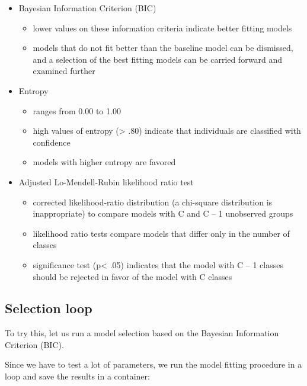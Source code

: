 \documentclass[
]{book}
\providecommand{\tightlist}{%
  \setlength{\itemsep}{0pt}\setlength{\parskip}{0pt}}
\begin{document}
\begin{itemize}
\tightlist
\item
  Bayesian Information Criterion (BIC)

  \begin{itemize}
  \tightlist
  \item
    lower values on these information criteria indicate better fitting models
  \item
    models that do not fit better than the baseline model can be dismissed, and a selection of the best fitting models can be carried forward and examined further
  \end{itemize}
\item
  Entropy

  \begin{itemize}
  \tightlist
  \item
    ranges from 0.00 to 1.00
  \item
    high values of entropy (\textgreater{} .80) indicate that individuals are classified with confidence
  \item
    models with higher entropy are favored
  \end{itemize}
\item
  Adjusted Lo-Mendell-Rubin likelihood ratio test

  \begin{itemize}
  \tightlist
  \item
    corrected likelihood-ratio distribution (a chi-square distribution is inappropriate) to compare models with C and C -- 1 unobserved groups
  \item
    likelihood ratio tests compare models that differ only in the number of classes
  \item
    significance test (p\textless{} .05) indicates that the model with C -- 1 classes should be rejected in favor of the model with C classes
  \end{itemize}
\end{itemize}

\hypertarget{selection-loop}{%
\subsection{Selection loop}\label{selection-loop}}

To try this, let us run a model selection based on the Bayesian Information Criterion (BIC).

Since we have to test a lot of parameters, we run the model fitting procedure in a loop and save the results in a container:
\end{document}
